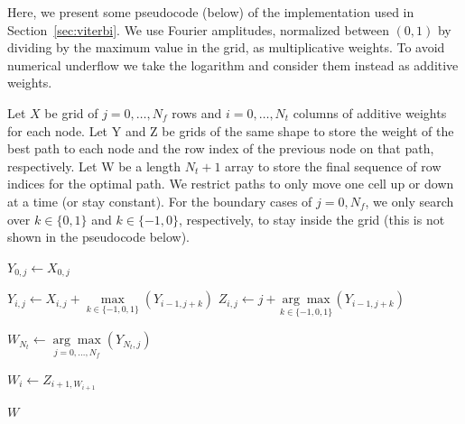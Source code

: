 \documentclass[paper-main.tex]{subfiles}
\begin{document}
Here, we present some pseudocode (below) of the implementation used in Section~\ref{sec:viterbi}. We use Fourier amplitudes, normalized between $(0, 1)$ by dividing by the maximum value in the grid, as multiplicative weights. To avoid numerical underflow we take the logarithm and consider them instead as additive weights.

Let $X$ be grid of $j=0,\ldots,N_f$ rows and $i=0,\ldots,N_t$ columns of additive weights for each node. Let Y and Z be grids of the same shape to store the weight of the best path to each node and the row index of the previous node on that path, respectively. Let W be a length $N_t+1$ array to store the final sequence of row indices for the optimal path. We restrict paths to only move one cell up or down at a time (or stay constant). For the boundary cases of $j=0,N_f$, we only search over $k \in \{0,1\}$ and $k \in \{-1,0\}$, respectively, to stay inside the grid (this is not shown in the pseudocode below).

\begin{algorithmic}

		\State $Y_{0,j} \gets X_{0,j}$
    \EndFor

		
	    	\State $Y_{i,j} \gets X_{i,j} + \underset{k \in \{-1,0,1\}}{\max} (Y_{i-1,j+k})$
	    	\State $Z_{i,j} \gets j + \underset{k \in \{-1,0,1\}}{\arg\max} (Y_{i-1,j+k})$
   
	    \EndFor
    \EndFor

    \State $W_{N_t} \gets \underset{j=0,\ldots,N_f}{\arg\max} (Y_{N_t,j})$


		\State $W_i \gets Z_{i+1, W_{i+1}}$

    \EndFor    

    \State \Return $W$
\EndFunction
\end{algorithmic}

\end{document}
